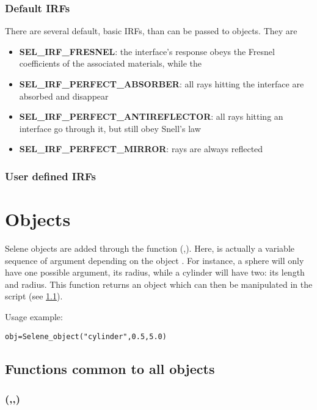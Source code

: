 \subsubsection{Default IRFs}

There are several default, basic IRFs, than can be passed to objects. They are
\begin{itemize}
	\item[] \textbf{SEL\_IRF\_FRESNEL}: the interface's response obeys the Fresnel coefficients of the associated materials, while the 
	\item[] \textbf{SEL\_IRF\_PERFECT\_ABSORBER}: all rays hitting the interface are absorbed and disappear
	\item[] \textbf{SEL\_IRF\_PERFECT\_ANTIREFLECTOR}: all rays hitting an interface go through it, but still obey Snell's law
	\item[] \textbf{SEL\_IRF\_PERFECT\_MIRROR}: rays are always reflected
\end{itemize}

\subsubsection{User defined IRFs}

\newpage
\section{Objects}

Selene objects are added through the function (,). Here,  is actually a variable sequence of argument depending on the object . For instance, a sphere will only have one possible argument, its radius, while a cylinder will have two: its length and radius. This function returns an object which can then be manipulated in the script (see \ref{selene_object_funcs}).

\noindent Usage example:
\begin{lstlisting}
obj=Selene_object("cylinder",0.5,5.0)
\end{lstlisting}

\subsection{Functions common to all objects}

\label{selene_object_funcs}

\subsubsection[contains]{(,,)}

